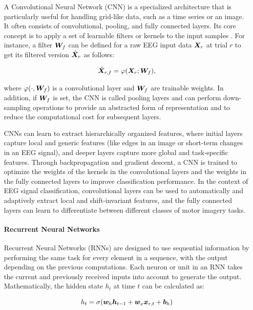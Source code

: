 A Convolutional Neural Network (CNN) is a specialized architecture that is particularly useful for handling grid-like data, such as a time series or an image. It often consists of convolutional, pooling, and fully connected layers. Its core concept is to apply a set of learnable filters or kernels to the input samples . For instance, a filter $\bm {W}_f$ can be defined for a raw EEG input data $\bm {X}_r$ at trial $r$ to get its filtered version $\hat{\bm {X}}_r$ as follows:

\begin{equation}
\hat{\bm {X}}_{r,f} = \varphi(\bm {X}_r; \bm {W}_f)  ,
\end{equation}

where $\varphi(\cdot, \bm {W}_f)$ is a convolutional layer and $\bm {W}_f$ are trainable weights. In addition, if $\bm {W}_f$ is set, the CNN is called pooling layers and can perform down-sampling operations to provide an abstracted form of representation and to reduce the computational cost for subsequent layers. 

CNNs can learn to extract hierarchically organized features, where initial layers capture local and generic features (like edges in an image or short-term changes in an EEG signal), and deeper layers capture more global and task-specific features. Through backpropagation and gradient descent, a CNN is trained to optimize the weights of the kernels in the convolutional layers and the weights in the fully connected layers to improve classification performance. In the context of EEG signal classification, convolutional layers can be used to automatically and adaptively extract local and shift-invariant features, and the fully connected layers can learn to differentiate between different classes of motor imagery tasks.

\paragraph{Recurrent Neural Networks}

Recurrent Neural Networks (RNNs) are designed to use sequential information by performing the same task for every element in a sequence, with the output depending on the previous computations. Each neuron or unit in an RNN takes the current and previously received inputs into account to generate the output. Mathematically, the hidden state $h_t$ at time $t$ can be calculated as:

\begin{equation}
h_t = \sigma(\bm {w}_{h} \bm {h}_{t-1} + \bm {w}_x \bm {x}_{r,t} + \bm {b}_h)
\end{equation}

